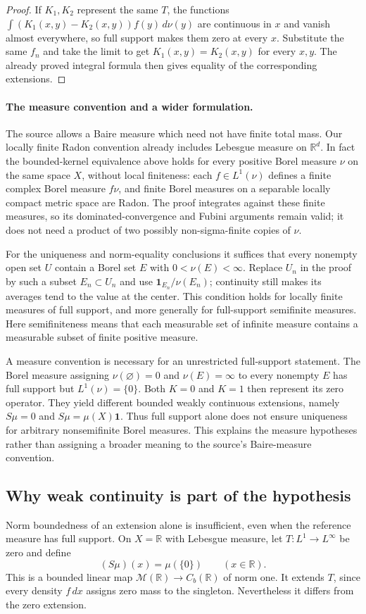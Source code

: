 \begin{proof}
If $K_1,K_2$ represent the same $T$, the functions
$\int(K_1(x,y)-K_2(x,y))f(y)\,d\nu(y)$ are continuous in $x$
and vanish almost everywhere, so full support makes them zero at
every $x$. Substitute the same $f_n$ and take the limit to get
$K_1(x,y)=K_2(x,y)$ for every $x,y$. The already proved integral
formula then gives equality of the corresponding extensions.
\end{proof}

\paragraph{The measure convention and a wider formulation.}
The source allows a Baire measure which need not have finite total
mass. Our locally finite Radon convention already includes Lebesgue
measure on $\mathbb R^d$. In fact the bounded-kernel equivalence above
holds for every positive Borel measure $\nu$ on the same space $X$,
without local finiteness: each $f\in L^1(\nu)$ defines a finite complex
Borel measure $f\nu$, and finite Borel measures on a separable locally
compact metric space are Radon. The proof integrates against these
finite measures, so its dominated-convergence and Fubini arguments
remain valid; it does not need a product of two possibly non-sigma-finite
copies of $\nu$.

For the uniqueness and norm-equality conclusions it suffices that
every nonempty open set $U$ contain a Borel set $E$ with
$0<\nu(E)<\infty$. Replace $U_n$ in the proof by such a subset
$E_n\subset U_n$ and use $\mathbf1_{E_n}/\nu(E_n)$; continuity
still makes its averages tend to the value at the center. This
condition holds for locally finite measures of full support, and more
generally for full-support semifinite measures. Here semifiniteness
means that each measurable set of infinite measure contains a measurable
subset of finite positive measure.

A measure convention is necessary for an unrestricted full-support
statement. The Borel measure assigning $\nu(\varnothing)=0$ and
$\nu(E)=\infty$ to every nonempty $E$ has full support but
$L^1(\nu)=\{0\}$. Both $K=0$ and $K=1$ then represent its zero
operator. They yield different bounded weakly continuous extensions,
namely $S\mu=0$ and $S\mu=\mu(X)\mathbf1$. Thus full support alone
does not ensure uniqueness for arbitrary nonsemifinite Borel measures.
This explains the measure hypotheses rather than assigning a broader
meaning to the source's Baire-measure convention.

\subsection{Why weak continuity is part of the hypothesis}
Norm boundedness of an extension alone is insufficient, even when the
reference measure has full support. On $X=\mathbb R$ with Lebesgue
measure, let $T:L^1\to L^\infty$ be zero and define
\[
(S\mu)(x)=\mu(\{0\})\qquad(x\in\mathbb R).
\]
This is a bounded linear map $\mathcal M(\mathbb R)\to C_b(\mathbb R)$
of norm one. It extends $T$, since every density $f\,dx$ assigns zero
mass to the singleton. Nevertheless it differs from the zero extension.

